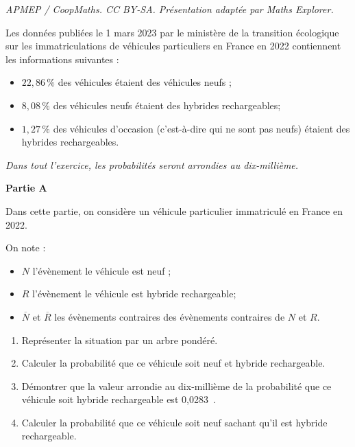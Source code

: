 \documentclass[10pt]{article}
\providecommand{\np}[2][]{{#2~#1}}
\begin{document}
\noindent\textit{APMEP / CoopMaths. CC BY-SA. Présentation adaptée par Maths Explorer.}\par\medskip
Les données publiées le 1 mars 2023 par le ministère de la transition écologique sur les immatriculations de véhicules particuliers en France en 2022 contiennent les informations suivantes :

	\begin{itemize}
		\item $22,86\,\%$ des véhicules étaient des véhicules neufs ;
		\item $8,08\,\%$ des véhicules neufs étaient des hybrides rechargeables;
		\item $1,27\,\%$ des véhicules d'occasion (c'est-à-dire qui ne sont pas neufs) étaient des hybrides rechargeables.
	\end{itemize}

	\emph{Dans tout l'exercice, les probabilités seront arrondies au dix-millième.}
	
\medskip
	
	\textbf{Partie A}

Dans cette partie, on considère un véhicule particulier immatriculé en France en 2022.

On note :

\begin{itemize}
	\item $N$ l'évènement \og le véhicule est neuf \fg{};
	\item $R$ l'évènement \og le véhicule est hybride rechargeable\fg{};
	\item $\overline{N}$ et $\overline{R}$ les évènements contraires des évènements contraires de $N$ et $R$.
\end{itemize}

\begin{enumerate}
\item Représenter la situation par un arbre pondéré.

\item Calculer la probabilité que ce véhicule soit neuf et hybride rechargeable.

\item Démontrer que la valeur arrondie au dix-millième de la probabilité que ce véhicule soit hybride rechargeable est \np{0,0283}.

\item Calculer la probabilité que ce véhicule soit neuf sachant qu'il est hybride rechargeable.
\end{enumerate}
\end{document}
